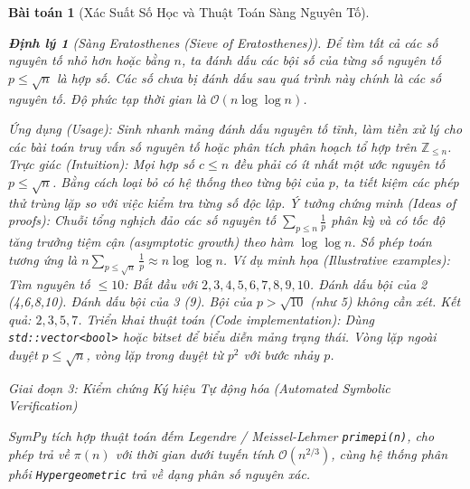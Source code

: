 \documentclass{article}
\newtheorem{baitoan}{Bài toán}
\newtheorem{dinhly}{Định lý}
\begin{document}
\begin{baitoan}[Xác Suất Số Học và Thuật Toán Sàng Nguyên Tố]
\begin{dinhly}[Sàng Eratosthenes (Sieve of Eratosthenes)]
    Để tìm tất cả các số nguyên tố nhỏ hơn hoặc bằng $n$, ta đánh dấu các bội số của từng số nguyên tố $p \le \sqrt{n}$ là hợp số. Các số chưa bị đánh dấu sau quá trình này chính là các số nguyên tố. Độ phức tạp thời gian là $\mathcal{O}(n \log \log n)$.
\end{dinhly}
\emph{Ứng dụng (Usage):} Sinh nhanh mảng đánh dấu nguyên tố tĩnh, làm tiền xử lý cho các bài toán truy vấn số nguyên tố hoặc phân tích phân hoạch tổ hợp trên $\mathbb{Z}_{\le n}$.
\emph{Trực giác (Intuition):} Mọi hợp số $c \le n$ đều phải có ít nhất một ước nguyên tố $p \le \sqrt{n}$. Bằng cách loại bỏ có hệ thống theo từng bội của $p$, ta tiết kiệm các phép thử trùng lặp so với việc kiểm tra từng số độc lập.
\emph{Ý tưởng chứng minh (Ideas of proofs):} Chuỗi tổng nghịch đảo các số nguyên tố $\sum_{p \le n} \frac{1}{p}$ phân kỳ và có tốc độ tăng trưởng tiệm cận (asymptotic growth) theo hàm $\log \log n$. Số phép toán tương ứng là $n \sum_{p \le \sqrt{n}} \frac{1}{p} \approx n \log \log n$.
\emph{Ví dụ minh họa (Illustrative examples):} Tìm nguyên tố $\le 10$: Bắt đầu với $2,3,4,5,6,7,8,9,10$. Đánh dấu bội của 2 (4,6,8,10). Đánh dấu bội của 3 (9). Bội của $p > \sqrt{10}$ (như 5) không cần xét. Kết quả: $2,3,5,7$.
\emph{Triển khai thuật toán (Code implementation):} Dùng \texttt{std::vector<bool>} hoặc bitset để biểu diễn mảng trạng thái. Vòng lặp ngoài duyệt $p \le \sqrt{n}$, vòng lặp trong duyệt từ $p^2$ với bước nhảy $p$.



\vspace{0.5em}\noindent\emph{Giai đoạn 3: Kiểm chứng Ký hiệu Tự động hóa (Automated Symbolic Verification)}
 
 \textsf{SymPy} tích hợp thuật toán đếm Legendre / Meissel-Lehmer \texttt{primepi(n)}, cho phép trả về $\pi(n)$ với thời gian dưới tuyến tính $\mathcal{O}(n^{2/3})$, cùng hệ thống phân phối \texttt{Hypergeometric} trả về dạng phân số nguyên xác.


\end{baitoan}
\end{document}
